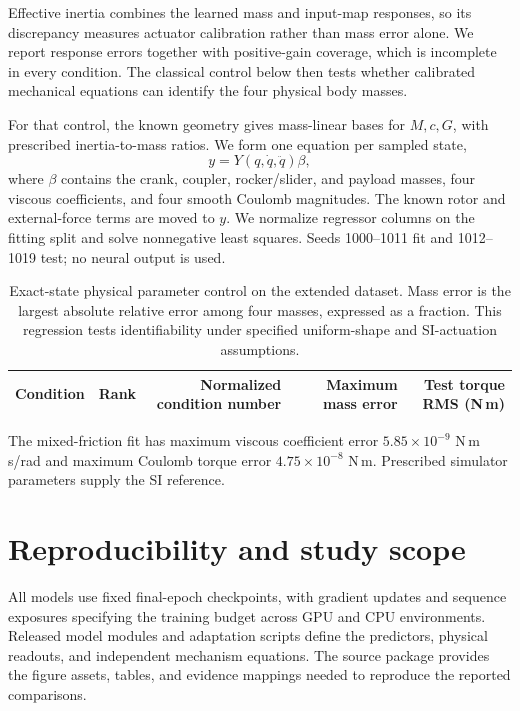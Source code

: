 \documentclass[10pt,twocolumn,letterpaper]{article}
\begin{document}
Effective inertia combines the learned mass and input-map responses, so its discrepancy measures actuator calibration rather than mass error alone. We report response errors together with positive-gain coverage, which is incomplete in every condition. The classical control below then tests whether calibrated mechanical equations can identify the four physical body masses.

For that control, the known geometry gives mass-linear bases for $M,c,G$, with prescribed inertia-to-mass ratios. We form one equation per sampled state,
\begin{equation}
y=Y(q,\dot q,\ddot q)\beta,
\end{equation}
where $\beta$ contains the crank, coupler, rocker/slider, and payload masses, four viscous coefficients, and four smooth Coulomb magnitudes. The known rotor and external-force terms are moved to $y$. We normalize regressor columns on the fitting split and solve nonnegative least squares. Seeds 1000--1011 fit and 1012--1019 test; no neural output is used.

\begin{table}[t]
\caption{Exact-state physical parameter control on the extended dataset. Mass error is the largest absolute relative error among four masses, expressed as a fraction. This regression tests identifiability under specified uniform-shape and SI-actuation assumptions.}
\centering
\small
\begin{tabular}{lrrrr}
\toprule
Condition & Rank & Normalized condition number & Maximum mass error & Test torque RMS (N\,m)\\
\midrule

\bottomrule
\end{tabular}
\end{table}

The mixed-friction fit has maximum viscous coefficient error $5.85\times10^{-9}$ N\,m\,s/rad and maximum Coulomb torque error $4.75\times10^{-8}$ N\,m. Prescribed simulator parameters supply the SI reference.

\section{Reproducibility and study scope}
\label{app:reproducibility}
All models use fixed final-epoch checkpoints, with gradient updates and sequence exposures specifying the training budget across GPU and CPU environments. Released model modules and adaptation scripts define the predictors, physical readouts, and independent mechanism equations. The source package provides the figure assets, tables, and evidence mappings needed to reproduce the reported comparisons.
\end{document}
